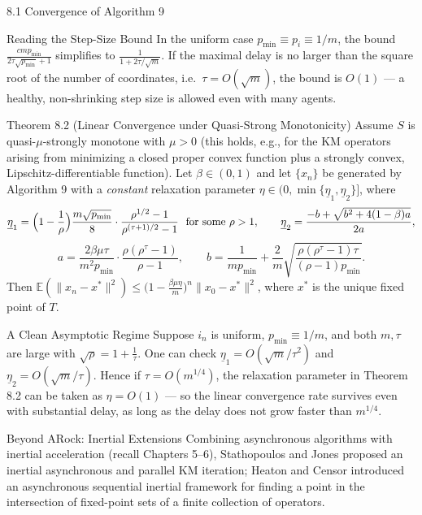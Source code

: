 \documentclass[aspectratio=169,10pt]{beamer}
\newcommand{\norm}[1]{\lVert #1 \rVert}
\begin{document}
\begin{frame}[allowframebreaks]{8.1 Convergence of Algorithm 9}
\framebreak

\begin{alertblock}{Reading the Step-Size Bound}
In the uniform case $p_{\min}\equiv p_i\equiv 1/m$, the bound $\frac{cmp_{\min}}{2\tau\sqrt{p_{\min}}+1}$ simplifies to $\frac{1}{1+2\tau/\sqrt m}$. If the maximal delay is no larger than the square root of the number of coordinates, i.e.\ $\tau=O(\sqrt m)$, the bound is $O(1)$ --- a healthy, non-shrinking step size is allowed even with many agents.
\end{alertblock}

\begin{block}{Theorem 8.2 (Linear Convergence under Quasi-Strong Monotonicity)}
Assume $S$ is quasi-$\mu$-strongly monotone with $\mu>0$ (this holds, e.g., for the KM operators arising from minimizing a closed proper convex function plus a strongly convex, Lipschitz-differentiable function). Let $\beta\in(0,1)$ and let $\{x_n\}$ be generated by Algorithm 9 with a \emph{constant} relaxation parameter $\eta\in(0,\min\{\underline\eta_1,\underline\eta_2\}]$, where
\[
  \underline\eta_1 = \Bigl(1-\frac1\rho\Bigr)\frac{m\sqrt{p_{\min}}}{8}\cdot\frac{\rho^{1/2}-1}{\rho^{(\tau+1)/2}-1} \ \text{ for some } \rho>1,
  \qquad
  \underline\eta_2 = \frac{-b+\sqrt{b^2+4(1-\beta)a}}{2a},
\]
\[
  a = \frac{2\beta\mu\tau}{m^2p_{\min}}\cdot\frac{\rho(\rho^\tau-1)}{\rho-1}, \qquad
  b = \frac{1}{mp_{\min}} + \frac2m\sqrt{\frac{\rho(\rho^\tau-1)\tau}{(\rho-1)p_{\min}}}.
\]
Then $\mathbb E(\norm{x_n-x^*}^2)\le\bigl(1-\frac{\beta\mu\eta}{m}\bigr)^n\norm{x_0-x^*}^2$, where $x^*$ is the unique fixed point of $T$.
\end{block}

\begin{alertblock}{A Clean Asymptotic Regime}
Suppose $i_n$ is uniform, $p_{\min}\equiv 1/m$, and both $m,\tau$ are large with $\sqrt\rho=1+\tfrac1\tau$. One can check $\underline\eta_1=O(\sqrt m/\tau^2)$ and $\underline\eta_2=O(\sqrt m/\tau)$. Hence if $\tau=O(m^{1/4})$, the relaxation parameter in Theorem 8.2 can be taken as $\eta=O(1)$ --- so the linear convergence rate survives even with substantial delay, as long as the delay does not grow faster than $m^{1/4}$.
\end{alertblock}

\begin{block}{Beyond ARock: Inertial Extensions}
Combining asynchronous algorithms with inertial acceleration (recall Chapters 5--6), Stathopoulos and Jones proposed an inertial asynchronous and parallel KM iteration; Heaton and Censor introduced an asynchronous sequential inertial framework for finding a point in the intersection of fixed-point sets of a finite collection of operators.
\end{block}

\end{frame}
\end{document}
